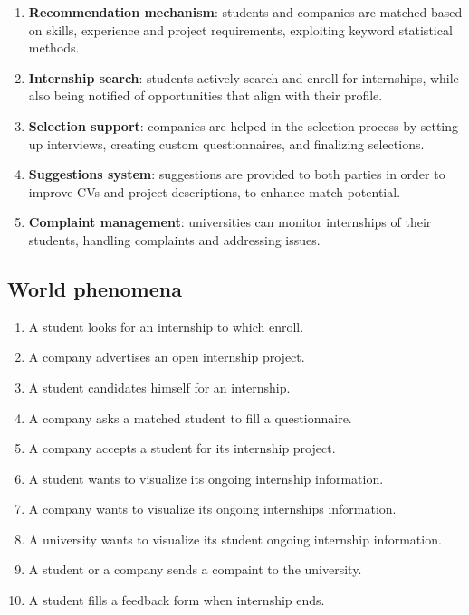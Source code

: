 \begin{enumerate}[label=\textbf{F\arabic* -}]
    \item \textbf{Recommendation mechanism}: students and companies are matched based on skills, experience and project requirements, exploiting keyword statistical methods.
    \item \textbf{Internship search}: students actively search and enroll for internships, while also being notified of opportunities that align with their profile.
    \item \textbf{Selection support}: companies are helped in the selection process by setting up interviews, creating custom questionnaires, and finalizing selections.
    \item \textbf{Suggestions system}: suggestions are provided to both parties in order to improve CVs and project descriptions, to enhance match potential.
    \item \textbf{Complaint management}: universities can monitor internships of their students, handling complaints and addressing issues.
\end{enumerate}

\subsection{World phenomena}

\begin{enumerate}[label=\textbf{WP\arabic* -}]
    \item A student looks for an internship to which enroll.
    \item A company advertises an open internship project.
    \item A student candidates himself for an internship.
    \item A company asks a matched student to fill a questionnaire.
    \item A company accepts a student for its internship project.
    \item A student wants to visualize its ongoing internship information.
    \item A company wants to visualize its ongoing internships information.
    \item A university wants to visualize its student ongoing internship information.
    \item A student or a company sends a compaint to the university.
    \item A student fills a feedback form when internship ends.
\end{enumerate}

